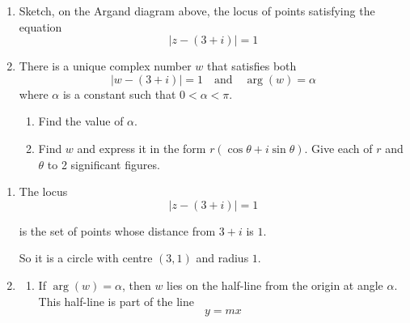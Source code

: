\documentclass[leqno]{article}
\begin{document}
\begin{enumerate}[
  label=\textbf{\arabic*.},
  leftmargin=*,
  topsep=0pt,
  partopsep=0pt,
  parsep=0pt
]
\begin{enumerate}[label=\textbf{(\alph*)}]
  \item Sketch, on the Argand diagram above, the locus of points satisfying the equation
  \[
  |z-(3+i)|=1
  \]
  \item There is a unique complex number $w$ that satisfies both
  \[
  |w-(3+i)|=1 \quad \text{and} \quad \arg(w)=\alpha
  \]
  where $\alpha$ is a constant such that $0<\alpha<\pi$.
  \begin{enumerate}[label=(\roman*)]
    \item Find the value of $\alpha$. 
    \item Find $w$ and express it in the form $r(\cos\theta+i\sin\theta)$. Give each of $r$ and $\theta$ to 2 significant figures.  \\
  \end{enumerate}
\end{enumerate}

\vspace*{0pt}

\begin{djsSolution}
\begin{enumerate}[label=\textbf{(\alph*)}]
  \item The locus
  \[
  |z-(3+i)|=1
  \]

  is the set of points whose distance from \(3+i\) is \(1\).

  So it is a circle with centre \((3,1)\) and radius \(1\).\par\nopagebreak

  
\begin{figure}[H]
    \centering
{}
\end{figure}

  \item
  \begin{enumerate}[label=(\roman*)]
    \item If \(\arg(w)=\alpha\), then \(w\) lies on the half-line from the origin at angle \(\alpha\). This half-line is part of the line
    \[
    y=mx
    \]


\end{enumerate}
\end{enumerate}
\end{djsSolution}
\end{enumerate}
\end{document}
